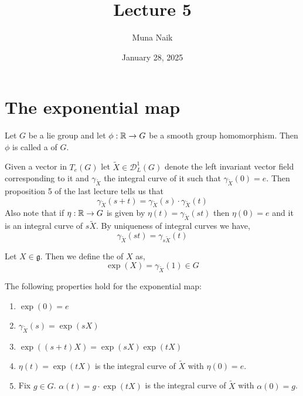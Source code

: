 \documentclass{article}
\title{Lecture 5}
\date{January 28, 2025}
\author{Muna Naik}
\begin{document}
\maketitle

\section{The exponential map}

\begin{definition}
    Let $G$ be a lie group and let $\phi:\mathbb R\to G$ be a smooth group homomorphism. Then $\phi$ is called a  of $G$.
\end{definition}

Given a vector in $T_e(G)$ let $\tilde{X}\in \mathcal{D}_L^1(G)$ denote the left invariant vector field corresponding to it and $\gamma_{\tilde{X}}$ the integral curve of it such that $\gamma_{\tilde{X}}(0)=e$. Then proposition 5 of the last lecture tells us that
$$\gamma_{\tilde{X}}(s+t) = \gamma_{\tilde{X}}(s)\cdot \gamma_{\tilde{X}}(t)$$
Also note that if $\eta:\mathbb R\to G$ is given by $\eta(t) = \gamma_{\tilde{X}}(st)$ then $\eta(0)=e$ and it is an integral curve of $s\tilde{X}$. By uniqueness of integral curves we have,
$$\gamma_{\tilde{X}}(st) = \gamma_{s\tilde{X}}(t)$$

\begin{definition}
    Let $X\in \mathfrak{g}$. Then we define the  of $X$ as, $$\exp(X) = \gamma_{\tilde{X}}(1)\in G$$
\end{definition}

\begin{proposition}
    The following properties hold for the exponential map:
    \begin{enumerate}
        \item $\exp(0) = e$ 
        \item $\gamma_{\tilde{X}}(s) = \exp(sX)$
        \item $\exp((s+t)X) = \exp(sX)\exp(tX)$
        \item $\eta(t) = \exp(tX)$ is the integral curve of $\tilde{X}$ with $\eta(0)=e$. 
        \item Fix $g\in G$. $\alpha(t) = g\cdot \exp(tX)$ is the integral curve of $\tilde{X}$ with $\alpha(0)=g$.
    \end{enumerate}
\end{proposition}
\end{document}
